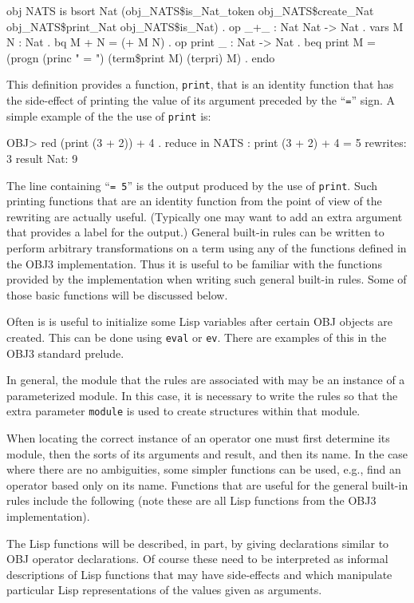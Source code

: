 \bobj
obj NATS is
  bsort Nat (obj\_NATS\$is\_Nat\_token obj\_NATS\$create\_Nat
               obj\_NATS\$print\_Nat obj\_NATS\$is\_Nat) .
  op _+_ : Nat Nat -> Nat .
  vars M N : Nat .
  bq M + N = (+ M N) .
  op print _ : Nat -> Nat .
  beq print M = (progn (princ " = ") (term\$print M) (terpri) M) .
endo
\eobj

This definition provides a function, {\tt print}, that is an identity
function that has the side-effect of printing the value of its
argument preceded by the ``{\tt =}'' sign.  A simple example of the
the use of {\tt print} is:

\bobj
OBJ> red (print (3 + 2)) + 4 .
reduce in NATS : print (3 + 2) + 4
 = 5
rewrites: 3
result Nat: 9
\eobj

\noindent The line containing ``{\tt = 5}'' is the output produced by
the use of {\tt print}.  Such printing functions that are an identity
function from the point of view of the rewriting are actually useful.
(Typically one may want to add an extra argument that provides a label
for the output.)  General built-in rules can be written to perform
arbitrary transformations on a term using any of the functions defined
in the OBJ3 implementation.  Thus it is useful to be familiar with the
functions provided by the implementation when writing such general
built-in rules.  Some of those basic functions will be discussed
below.

Often is is useful to initialize some Lisp variables after certain
OBJ objects are created.  This can be done using {\tt eval} or
{\tt ev}.  There are examples of this in the OBJ3 standard prelude.

In general, the module that the rules are associated with may be
an instance of a parameterized module.  In this case, it is
necessary to write the rules so that the extra parameter {\tt module}
is used to create structures within that module.

When locating the correct instance of an operator one must first
determine its module, then the sorts of its arguments and result, and
then its name.  In the case where there are no ambiguities, some
simpler functions can be used, e.g., find an operator based only on
its name.  Functions that are useful for the general built-in rules
include the following (note these are all Lisp functions from the
OBJ3 implementation).

The Lisp functions will be described, in part, by giving declarations
similar to OBJ operator declarations.  Of course these need to be
interpreted as informal descriptions of Lisp functions that may have
side-effects and which manipulate particular Lisp representations of the
values given as arguments.

